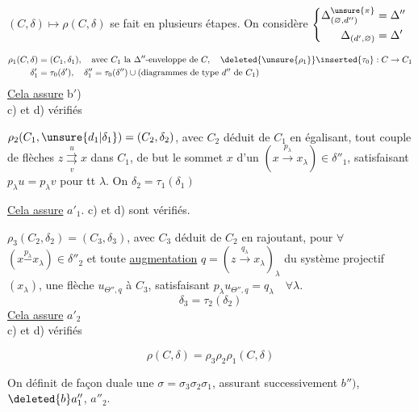 
$(C,\delta)\longmapsto\rho(C,\delta)$ se fait en plusieurs étapes. On considère $\left\{\begin{aligned}\Delta^{\unsure{\pi}}_{(\varnothing,d'')}&=\Delta''\\\Delta_{(d',\varnothing)}&=\Delta'\end{aligned}\right.$

\[
\begin{aligned}
\rho_1(C,\delta)&=(C_1,\delta_1),\quad\text{avec }C_1\text{ la }\Delta''\text{-enveloppe de }C,\quad\deleted{\unsure{\rho_1}}\inserted{\tau_0}:C\to C_1\\
\delta'_1&=\tau_0(\delta'),\quad\delta''_1=\tau_0(\delta'')\cup(\text{diagrammes de type }d''\text{ de }C_1)
\end{aligned}
\]
\uline{Cela assure} b$'$)\\
c) et d) vérifiés

$\rho_2(C_1,\unsure{d_1|\delta_1})=(C_2,\delta_2)$,  avec $C_2$ déduit de $C_1$ en égalisant, tout couple de flèches $z\overset{u}{\underset{v}{\rightrightarrows}}x$ dans $C_1$, de but le sommet $x$ d'un $(x\xrightarrow{p_\lambda}x_\lambda)\in\delta''_1$, satisfaisant $p_\lambda u=p_\lambda v$ pour tt $\lambda$. On  $\delta_2=\tau_1(\delta_1)$

\uline{Cela assure} $a'_1$. c) et d) sont vérifiés.

$\rho_3(C_2,\delta_2)=(C_3,\delta_3)$,  avec $C_3$ déduit de $C_2$ en rajoutant, pour $\forall$   $(x\overset{p_\lambda}{-}x_\lambda)\in\delta''_2$ et toute \uline{augmentation} $q=(z\xrightarrow{q_\lambda}x_\lambda)_\lambda$ du système projectif $(x_\lambda)$, une flèche $u_{\Theta'',q}$ à $C_3$, satisfaisant $p_\lambda u_{\Theta'',q}=q_\lambda\quad\forall\lambda$.
\[
\delta_3=\tau_2(\delta_2)
\]
\uline{Cela assure} $a'_2$\\
c) et d) vérifiés


\[\rho(C,\delta)=\rho_3\rho_2\rho_1(C,\delta)\]

On définit de façon duale une  $\sigma=\sigma_3\sigma_2\sigma_1$, assurant successivement $b'')$, $\deleted{b}a''_1$, $a''_2$.

